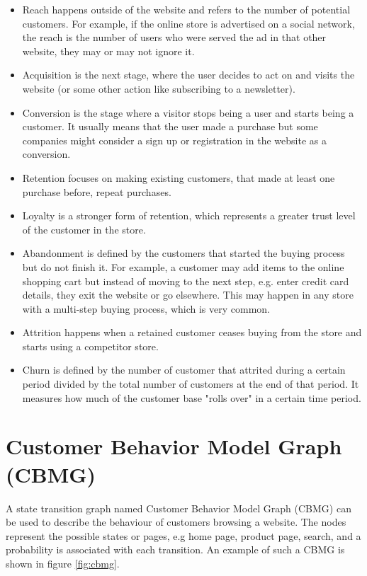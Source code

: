 \begin{itemize}
    \item Reach happens outside of the website and refers to the number of 
    potential customers. For example, if the online store is advertised on a 
    social network, the reach is the number of users who were served the ad in 
    that other website, they may or may not ignore it.
    \item Acquisition is the next stage, where the user decides to act on and 
    visits the website (or some other action like subscribing to a newsletter).
    \item Conversion is the stage where a visitor stops being a user and starts 
    being a customer. It usually means that the user made a purchase but some 
    companies might consider a sign up or registration in the website as a 
    conversion.
    \item Retention focuses on making existing customers, that made at least 
    one purchase before, repeat purchases.
    \item Loyalty is a stronger form of retention, which represents a greater 
    trust level of the customer in the store.
    \item Abandonment is defined by the customers that started the buying 
    process but do not finish it. For example, a customer may add items to the 
    online shopping cart but instead of moving to the next step, e.g. enter 
    credit card details, they exit the website or go elsewhere. This may happen 
    in any store with a multi-step buying process, which is very common.
    \item Attrition happens when a retained customer ceases buying from the 
    store and starts using a competitor store.
    \item Churn is defined by the number of customer that attrited during a 
    certain period divided by the total number of customers at the end of that 
    period. It measures how much of the customer base "rolls over" in a certain 
    time period.
\end{itemize}

\section{Customer Behavior Model Graph (CBMG)}

A state transition graph named Customer Behavior Model Graph (CBMG) can be used 
to describe the behaviour of customers browsing a website. The nodes represent 
the possible states or pages, e.g home page, product page, search, and a 
probability is associated with each transition. An example of such a CBMG is 
shown in figure \ref{fig:cbmg}.

